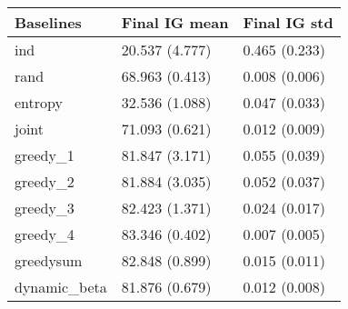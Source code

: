 \begin{tabular}{lll}
\toprule
    Baselines &   Final IG mean &   Final IG std \\
\midrule
          ind &  20.537 (4.777) &  0.465 (0.233) \\
         rand &  68.963 (0.413) &  0.008 (0.006) \\
      entropy &  32.536 (1.088) &  0.047 (0.033) \\
        joint &  71.093 (0.621) &  0.012 (0.009) \\
     greedy\_1 &  81.847 (3.171) &  0.055 (0.039) \\
     greedy\_2 &  81.884 (3.035) &  0.052 (0.037) \\
     greedy\_3 &  82.423 (1.371) &  0.024 (0.017) \\
     greedy\_4 &  83.346 (0.402) &  0.007 (0.005) \\
    greedysum &  82.848 (0.899) &  0.015 (0.011) \\
 dynamic\_beta &  81.876 (0.679) &  0.012 (0.008) \\
\bottomrule
\end{tabular}
